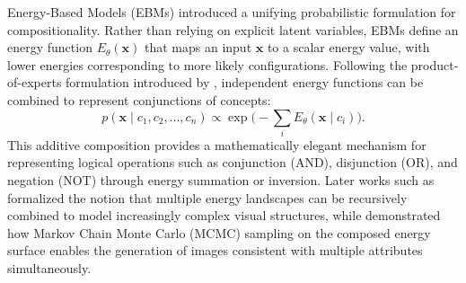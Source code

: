Energy-Based Models (EBMs) introduced a unifying probabilistic formulation for compositionality.  
Rather than relying on explicit latent variables, EBMs define an energy function $E_\theta(\mathbf{x})$ that maps an input $\mathbf{x}$ to a scalar energy value, with lower energies corresponding to more likely configurations.  
Following the product-of-experts formulation introduced by \citet{product_of_experts}, independent energy functions can be combined to represent conjunctions of concepts:
\[
p(\mathbf{x} \mid c_1, c_2, \dots, c_n) \propto \exp\!\Big(-\sum_i E_\theta(\mathbf{x} \mid c_i)\Big).
\]
This additive composition provides a mathematically elegant mechanism for representing logical operations such as conjunction (AND), disjunction (OR), and negation (NOT) through energy summation or inversion.  
Later works such as \citet{shazeer2017outrageously,multi_object_representation_learning_iterative_variational_inference_2019} formalized the notion that multiple energy landscapes can be recursively combined to model increasingly complex visual structures, while \citet{NEURIPS2020_49856ed4} demonstrated how Markov Chain Monte Carlo (MCMC) sampling on the composed energy surface enables the generation of images consistent with multiple attributes simultaneously.



